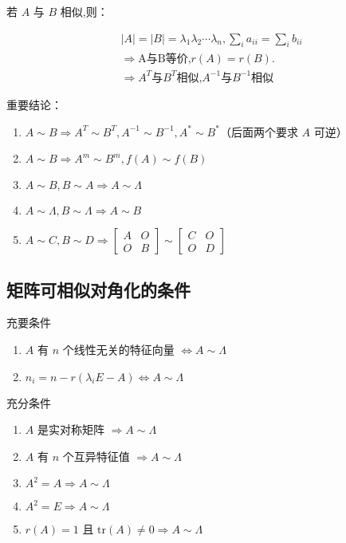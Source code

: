 \documentclass[UTF8]{ctexart}
\theoremstyle{remark}
\begin{document}
	若 \(A\) 与 \(B\) 相似,则：
	
	\begin{align*}
		&|A| = |B| = \lambda_1\lambda_2\cdots\lambda_n, \sum_{i} a_{ii} = \sum_{i} b_{ii}\\
		&\Rightarrow \text{A与B等价,}r(A) = r(B).\\
		&\Rightarrow A^T\text{与}B^T\text{相似,}A^{-1}\text{与}B^{-1}\text{相似}
	\end{align*}
	
	
	重要结论：
	\begin{enumerate}
		\item \(A\sim B \Rightarrow A^T\sim B^T, A^{-1}\sim B^{-1}, A^*\sim B^*\)（后面两个要求 \(A\) 可逆）
		\item \(A\sim B \Rightarrow A^m\sim B^m, f(A)\sim f(B)\)
		\item \(A\sim B, B\sim A \Rightarrow A\sim \Lambda\)
		\item \(A\sim \Lambda, B\sim \Lambda \Rightarrow A\sim B\)
		\item \(A\sim C, B\sim D \Rightarrow \begin{bmatrix}A & O\\O & B\end{bmatrix}\sim\begin{bmatrix}C & O\\O & D\end{bmatrix}\)
	\end{enumerate}
	
	\subsection{矩阵可相似对角化的条件}
	充要条件
	\begin{enumerate}
		\item \(A\) 有 \(n\) 个线性无关的特征向量 \(\Leftrightarrow A\sim \Lambda\)
		\item \(n_i = n - r(\lambda_i E - A) \Leftrightarrow A\sim \Lambda\)
	\end{enumerate}
	
	充分条件
	\begin{enumerate}
		\item \(A\) 是实对称矩阵 \(\Rightarrow A\sim \Lambda\)
		\item \(A\) 有 \(n\) 个互异特征值 \(\Rightarrow A\sim \Lambda\)
		\item \(A^2 = A \Rightarrow A\sim \Lambda\)
		\item \(A^2 = E \Rightarrow A\sim \Lambda\)
		\item \(r(A) = 1\) 且 \(\text{tr}(A) \neq 0 \Rightarrow A\sim \Lambda\)
	\end{enumerate}
	
\end{document}
